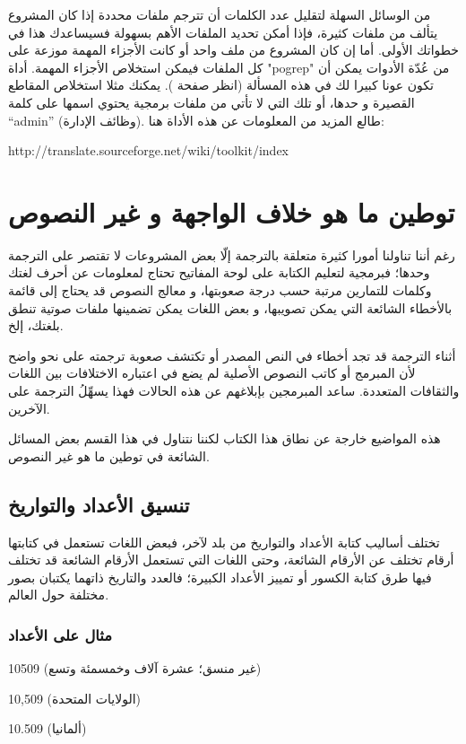 من الوسائل السهلة لتقليل عدد الكلمات أن تترجم ملفات محددة إذا كان
المشروع يتألف من ملفات كثيرة، فإذا أمكن تحديد الملفات الأهم بسهولة
فسيساعدك هذا في خطواتك الأولى. أما إن كان المشروع من ملف واحد أو كانت
الأجزاء المهمة موزعة على كل الملفات فيمكن استخلاص الأجزاء المهمة. أداة
"pogrep" من عُدّة الأدوات يمكن أن تكون عونا كبيرا لك في هذه المسألة
(انظر صفحة ). يمكنك مثلا استخلاص المقاطع
القصيرة و حدها، أو تلك التي لا تأتي من ملفات برمجية يحتوي اسمها على
كلمة “admin” (وظائف الإدارة). طالع المزيد من المعلومات عن هذه الأداة
هنا:

http://translate.sourceforge.net/wiki/toolkit/index

\section{توطين ما هو خلاف الواجهة و غير النصوص}
رغم أننا تناولنا أمورا كثيرة متعلقة بالترجمة إلّا بعض المشروعات لا تقتصر
على الترجمة وحدها؛ فبرمجية لتعليم الكتابة على لوحة المفاتيح تحتاج
لمعلومات عن أحرف لغتك وكلمات للتمارين مرتبة حسب درجة صعوبتها، و معالج
النصوص قد يحتاج إلى قائمة بالأخطاء الشائعة التي يمكن تصويبها، و بعض
اللغات يمكن تضمينها ملفات صوتية تنطق بلغتك، إلخ.

أثناء الترجمة قد تجد أخطاء في النص المصدر أو تكتشف صعوبة ترجمته على نحو
واضح لأن المبرمج أو كاتب النصوص الأصلية لم يضع في اعتباره الاختلافات
بين اللغات والثقافات المتعددة. ساعد المبرمجين بإبلاغهم عن هذه الحالات
فهذا يسهِّلُ الترجمة على الآخرين.

هذه المواضيع خارجة عن نطاق هذا الكتاب لكننا نتناول في هذا القسم بعض
المسائل الشائعة في توطين ما هو غير النصوص.

\subsection{تنسيق الأعداد والتواريخ}
تختلف أساليب كتابة الأعداد
والتواريخ من بلد لآخر، فبعض اللغات تستعمل في كتابتها أرقام تختلف عن
الأرقام الشائعة، وحتى اللغات التي تستعمل الأرقام الشائعة قد تختلف فيها
طرق كتابة الكسور أو تمييز الأعداد الكبيرة؛ فالعدد والتاريخ ذاتهما
يكتبان بصور مختلفة حول العالم.

\subsubsection{مثال على الأعداد}
10509 (غير منسق؛ عشرة آلاف وخمسمئة وتسع)

10,509 (الولايات المتحدة)

10.509 (ألمانيا)

